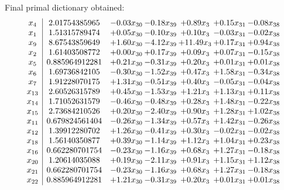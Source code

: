 \documentclass[8pt]{article}
\begin{document}
 Final primal dictionary obtained: 
\[\begin{array}{c| c c@{\hskip 2pt} c@{\hskip 2pt} c@{\hskip 2pt} c@{\hskip 2pt} c@{\hskip 2pt} }
 x_{4}   &  2.01754385965 & -0.03 x_{30} & -0.18 x_{39} & +  0.89 x_{3} & +  0.15 x_{31} & -0.08 x_{38}\\
 x_{1}   &  1.51315789474 & +  0.05 x_{30} & -0.10 x_{39} & +  0.10 x_{3} & -0.03 x_{31} & -0.02 x_{38}\\
 x_{9}   &  8.67543859649 & +  1.60 x_{30} & -4.12 x_{39} & + 11.49 x_{3} & +  0.17 x_{31} & +  0.94 x_{38}\\
 x_{2}   &  1.61403508772 & +  0.00 x_{30} & +  0.17 x_{39} & +  0.09 x_{3} & +  0.07 x_{31} & -0.15 x_{38}\\
 x_{5}   &  0.885964912281 & +  0.21 x_{30} & -0.31 x_{39} & +  0.20 x_{3} & +  0.01 x_{31} & +  0.01 x_{38}\\
 x_{6}   &  1.69736842105 & -0.30 x_{30} & -1.52 x_{39} & +  0.47 x_{3} & +  1.58 x_{31} & -0.34 x_{38}\\
 x_{7}   &  1.91228070175 & +  1.31 x_{30} & -0.51 x_{39} & +  0.40 x_{3} & -0.05 x_{31} & -0.04 x_{38}\\
 x_{13}   &  2.60526315789 & +  0.45 x_{30} & -1.53 x_{39} & +  1.21 x_{3} & +  1.13 x_{31} & +  0.11 x_{38}\\
 x_{14}   &  1.71052631579 & -0.46 x_{30} & -0.48 x_{39} & +  0.28 x_{3} & +  1.48 x_{31} & -0.22 x_{38}\\
 x_{15}   &  2.73684210526 & +  0.20 x_{30} & -2.40 x_{39} & +  0.90 x_{3} & +  1.28 x_{31} & +  1.02 x_{38}\\
 x_{11}   &  0.679824561404 & -0.26 x_{30} & -1.34 x_{39} & +  0.57 x_{3} & +  1.42 x_{31} & -0.26 x_{38}\\
 x_{12}   &  1.39912280702 & +  1.26 x_{30} & -0.41 x_{39} & +  0.30 x_{3} & -0.02 x_{31} & -0.02 x_{38}\\
 x_{18}   &  1.56140350877 & +  0.39 x_{30} & -1.14 x_{39} & +  1.12 x_{3} & +  1.04 x_{31} & +  0.23 x_{38}\\
 x_{16}   &  0.662280701754 & -0.23 x_{30} & -1.16 x_{39} & +  0.68 x_{3} & +  1.27 x_{31} & -0.18 x_{38}\\
 x_{20}   &  1.20614035088 & +  0.19 x_{30} & -2.11 x_{39} & +  0.91 x_{3} & +  1.15 x_{31} & +  1.12 x_{38}\\
 x_{21}   &  0.662280701754 & -0.23 x_{30} & -1.16 x_{39} & +  0.68 x_{3} & +  1.27 x_{31} & -0.18 x_{38}\\
 x_{22}   &  0.885964912281 & +  1.21 x_{30} & -0.31 x_{39} & +  0.20 x_{3} & +  0.01 x_{31} & +  0.01 x_{38}\\

\end{array}\]
\end{document}
